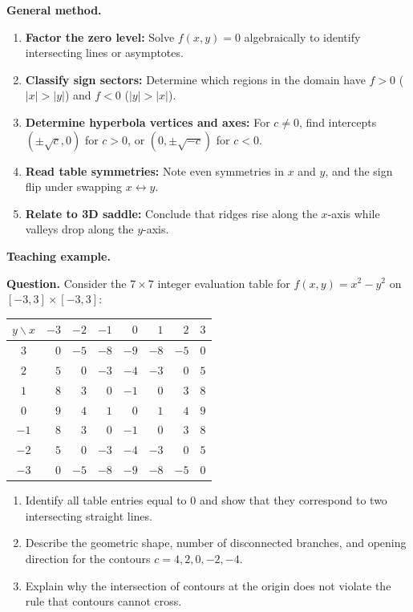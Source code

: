 \documentclass[11pt,letterpaper]{article}
\begin{document}
\textbf{General method.}
\begin{enumerate}[leftmargin=*,nosep]
    \item \textbf{Factor the zero level:} Solve $f(x,y) = 0$ algebraically to identify intersecting lines or asymptotes.
    \item \textbf{Classify sign sectors:} Determine which regions in the domain have $f > 0$ ($|x| > |y|$) and $f < 0$ ($|y| > |x|$).
    \item \textbf{Determine hyperbola vertices and axes:} For $c \ne 0$, find intercepts $(\pm\sqrt{c}, 0)$ for $c>0$, or $(0, \pm\sqrt{-c})$ for $c<0$.
    \item \textbf{Read table symmetries:} Note even symmetries in $x$ and $y$, and the sign flip under swapping $x \leftrightarrow y$.
    \item \textbf{Relate to 3D saddle:} Conclude that ridges rise along the $x$-axis while valleys drop along the $y$-axis.
\end{enumerate}

\textbf{Teaching example.}

\textbf{Question.} 
Consider the $7 \times 7$ integer evaluation table for $f(x,y) = x^2 - y^2$ on $[-3,3] \times [-3,3]$:
\begin{center}
\small
\begin{tabular}{c|rrrrrrr}
\toprule
$y \backslash x$ & $-3$ & $-2$ & $-1$ & $0$ & $1$ & $2$ & $3$ \\
\midrule
$3$  & $0$  & $-5$ & $-8$ & $-9$ & $-8$ & $-5$ & $0$  \\
$2$  & $5$  & $0$  & $-3$ & $-4$ & $-3$ & $0$  & $5$  \\
$1$  & $8$  & $3$  & $0$  & $-1$ & $0$  & $3$  & $8$  \\
$0$  & $9$  & $4$  & $1$  & $0$  & $1$  & $4$  & $9$  \\
$-1$ & $8$  & $3$  & $0$  & $-1$ & $0$  & $3$  & $8$  \\
$-2$ & $5$  & $0$  & $-3$ & $-4$ & $-3$ & $0$  & $5$  \\
$-3$ & $0$  & $-5$ & $-8$ & $-9$ & $-8$ & $-5$ & $0$  \\
\bottomrule
\end{tabular}
\end{center}
\begin{enumerate}[label=(\alph*),nosep]
    \item Identify all table entries equal to $0$ and show that they correspond to two intersecting straight lines.
    \item Describe the geometric shape, number of disconnected branches, and opening direction for the contours $c = 4, 2, 0, -2, -4$.
    \item Explain why the intersection of contours at the origin does not violate the rule that contours cannot cross.
\end{enumerate}
\end{document}
